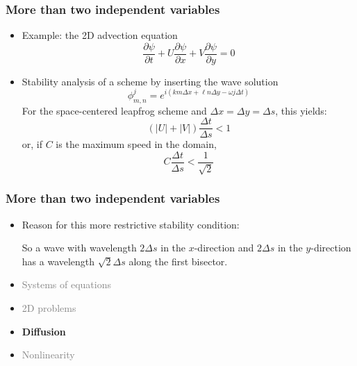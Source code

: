 \documentclass[aspectratio=43,9pt]{beamer}
\begin{document}
%
%
\begin{frame}
	\frametitle{More than two independent variables}
	\begin{itemize}
		\item Example: the 2D advection equation
			\begin{equation*}
				\frac{\partial \psi}{\partial t}+U\frac{\partial \psi}{\partial x}+V\frac{\partial \psi}{\partial y}=0
			\end{equation*}
		\item Stability analysis of a scheme by inserting the wave solution
			\begin{equation*}
				\phi^j_{m,n}=e^{i(km\Delta x+\ell n \Delta y-\omega j \Delta t)}
			\end{equation*}
			For the space-centered leapfrog scheme and $\Delta x =\Delta y=\Delta s$, this yields:
			\begin{equation*}
				(|U|+|V|)\frac{\Delta t}{\Delta s} < 1
			\end{equation*}
			or, if $C$ is the maximum speed in the domain,
			\begin{equation*}
				C\frac{\Delta t}{\Delta s} < \frac{1}{\sqrt{2}}
			\end{equation*}
	\end{itemize}
\end{frame}
%
%
\begin{frame}
	\frametitle{More than two independent variables}
	\begin{itemize}
		\item Reason for this more restrictive stability condition:
			\begin{center}
				\scalebox{.6}{\small}
			\end{center}
			So a wave with wavelength $2\Delta s$ in the $x$-direction and $2\Delta s$ in the $y$-direction has a wavelength $\sqrt{2}\Delta s$ along the first bisector.
	\end{itemize}
\end{frame}
%
%
\begin{frame}
	\begin{itemize}
		\item \textcolor{gray}{Systems of equations}
		\item \textcolor{gray}{2D problems}
		\item {\bfseries Diffusion}
		\item \textcolor{gray}{Nonlinearity}
	\end{itemize}
\end{frame}
\end{document}
